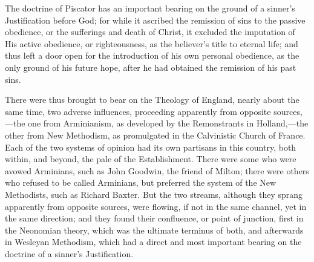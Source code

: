 \documentclass[
]{book}
\begin{document}
The doctrine of Piscator has an important bearing on the ground of a sinner's Justification before God; for while it ascribed the remission of sins to the passive obedience, or the sufferings and death of Christ, it excluded the imputation of His active obedience, or righteousness, as the believer's title to eternal life; and thus left a door open for the introduction of his own personal obedience, as the only ground of his future hope, after he had obtained the remission of his past sins.

There were thus brought to bear on the Theology of England, nearly about the same time, two adverse influences, proceeding apparently from opposite sources,---the one from Arminianism, as developed by the Remonstrants in Holland,---the other from New Methodism, as promulgated in the Calvinistic Church of France. Each of the two systems of opinion had its own partisans in this country, both within, and beyond, the pale of the Establishment. There were some who were avowed Arminians, such as John Goodwin, the friend of Milton; there were others who refused to be called Arminians, but preferred the system of the New Methodists, such as Richard Baxter. But the two streams, although they sprang apparently from opposite sources, were flowing, if not in the same channel, yet in the same direction; and they found their confluence, or point of junction, first in the Neonomian theory, which was the ultimate terminus of both, and afterwards in Wesleyan Methodism, which had a direct and most important bearing on the doctrine of a sinner's Justification.
\end{document}
